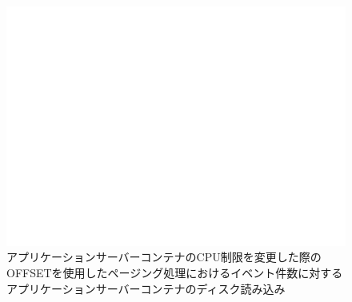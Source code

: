 \documentclass[../../../../../main]{subfiles}
\begin{document}
    \begin{figure}[H]
        \centering
        \includegraphics[width=12cm]{graph}
        \caption{アプリケーションサーバーコンテナのCPU制限を変更した際のOFFSETを使用したページング処理におけるイベント件数に対するアプリケーションサーバーコンテナのディスク読み込み}
        \label{fig:paging-offset-change-app-cpu-limit-app-disk-out-app_1024-db_1_1024}
    \end{figure}
\end{document}
